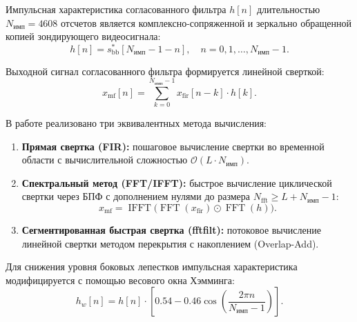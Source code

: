 Импульсная характеристика согласованного фильтра $h[n]$ длительностью $N_{\text{имп}} = 4608$ отсчетов является комплексно-сопряженной и зеркально обращенной копией зондирующего видеосигнала:
\begin{equation}
    h[n] = s_{\text{bb}}^*[N_{\text{имп}} - 1 - n], \quad n = 0, 1, \dots, N_{\text{имп}} - 1.
\end{equation}

Выходной сигнал согласованного фильтра формируется линейной сверткой:
\begin{equation}
    x_{\text{mf}}[n] = \sum_{k=0}^{N_{\text{имп}}-1} x_{\text{fir}}[n - k] \cdot h[k].
\end{equation}

В работе реализовано три эквивалентных метода вычисления:
\begin{enumerate}
    \item \textbf{Прямая свертка (FIR):} пошаговое вычисление свертки во временной области с вычислительной сложностью $\mathcal{O}(L \cdot N_{\text{имп}})$.
    \item \textbf{Спектральный метод (FFT/IFFT):} быстрое вычисление циклической свертки через БПФ с дополнением нулями до размера $N_{\text{fft}} \ge L + N_{\text{имп}} - 1$:
    \begin{equation}
        x_{\text{mf}} = \operatorname{IFFT}\Big( \operatorname{FFT}(x_{\text{fir}}) \odot \operatorname{FFT}(h) \Big).
    \end{equation}
    \item \textbf{Сегментированная быстрая свертка (fftfilt):} потоковое вычисление линейной свертки методом перекрытия с накоплением (Overlap-Add).
\end{enumerate}

Для снижения уровня боковых лепестков импульсная характеристика модифицируется с помощью весового окна Хэмминга:
\begin{equation}
    h_w[n] = h[n] \cdot \left[ 0.54 - 0.46 \cos\left(\frac{2\pi n}{N_{\text{имп}} - 1}\right) \right].
\end{equation}
